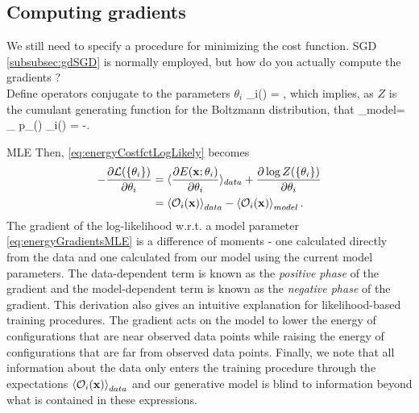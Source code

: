 \subsection{Computing gradients}
\label{subsec:energyGradients}
We still need to specify a procedure for minimizing the cost function. SGD \ref{subsubsec:gdSGD} is normally employed, but how do you actually compute the gradients ?\\
Define operators conjugate to the parameters $\theta_i$
\bse 
\mO_i(\mx) = ,
\ese 
which implies, as $Z$ is the cumulant generating function for the Boltzmann distribution, that
\bse 
{}_{model}= \tr_{\mx} p_{\theta}(\mx) \mO_i(\mx) = -.
\ese 
\begin{mybox}{MLE}
Then, \ref{eq:energyCostfctLogLikely} becomes
\begin{align}
	\label{eq:energyGradientsMLE}
	-\frac{\partial \mathcal{L}(\{\theta_i\})}{\partial \theta_i} &= \langle \frac{\partial E(\mathbf{x};\theta_i)}{\partial \theta_i}\rangle_{data} +\frac{\partial \log Z(\{\theta_i\})}{\partial \theta_i} \nonumber \\
	&=\expval{\mathcal{O}_i(\mathbf{x})}_{data} - \expval{\mathcal{O}_i(\mathbf{x})}_{model}.
\end{align}
The gradient of the log-likelihood w.r.t. a model parameter \ref{eq:energyGradientsMLE} is a difference of moments - one calculated directly from the data and one calculated from our model using the current model parameters. The data-dependent term is known as the \emph{positive phase} of the gradient and the model-dependent term is known as the \emph{negative phase} of the gradient. This derivation also gives an intuitive explanation for likelihood-based training procedures. The gradient acts on the model to lower the energy of configurations that are near observed data points while raising the energy of configurations that are far from observed data points. Finally, we note that all information about the data only enters the training procedure through the expectations $\expval{\mathcal{O}_i(\mathbf{x})}_{data}$ and our generative model is blind to information beyond what is contained in these expressions. 
\end{mybox}
